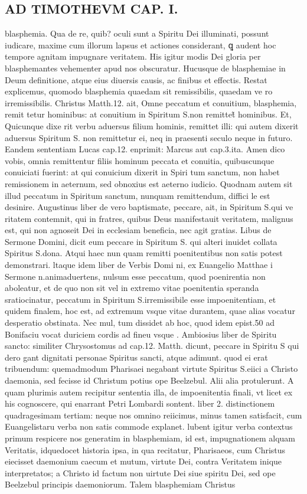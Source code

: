 \documentclass{article}
\begin{document}
\begin{pages}
\section*{AD TIMOTHEVM CAP. I. }
\marginpar{[ p.38 ]}\pstart blasphemia. Qua de re, quib? oculi sunt a Spiritu Dei illuminati, possunt iudicare, maxime cum illorum lapsus et actiones considerant, ꝗ audent hoc tempore agnitam impugnare veritatem. His igitur modis Dei gloria per blasphemantes vehementer apud nos obscuratur. Hucusque  de blasphemiae in Deum definitione, atque  eius diuersis causis, ac finibus et effectis. Restat explicemus, quomodo blasphemia quaedam sit remissibilis, quaedam ve ro irremissibilis. Christus Matth.12. ait, Omne peccatum et conuitium, blasphemia, remit tetur hominibus: at conuitium in Spiritum S.non remittet̃ hominibus. Et, Quicunque  dixe rit verbu aduersus filium hominis, remittet illi: qui autem dixerit aduersus Spiritum S. non remittetur ei, neq in praesenti seculo neque  in futuro. Eandem sententiam Lucas cap.12. enprimit: Marcus aut cap.3.ita. Amen dico vobis, omnia remittentur filiis hominum peccata et conuitia, quibuscunque  conuiciati fuerint: at qui conuicium dixerit in Spiri tum sanctum, non habet remissionem in aeternum, sed obnoxius est aeterno iudicio. Quodnam autem sit illud peccatum in Spiritum sanctum, nunquam remittendum, diffici le est desinire. Augustinus liber  de vero baptismate, peccare, ait, in Spiritum S.qui ve ritatem contemnit, qui in fratres, quibus Deus manifestauit veritatem, malignus est, qui non agnoseit Dei in ecclesiam beneficia, nec agit gratias. Libus de Sermone Domini, dicit eum peccare in Spiritum S. qui alteri inuidet collata Spiritus S.dona. Atqui haec nun quam remitti poenitentibus non satis potest demonstrari. ltaque  idem liber de Verbis Domi ni, ex Euangelio Matthae i Sermone n.animaduertens, nulsum esse peccatum, quod poenirentia non aboleatur, et de quo non sit vel in extremo vitae poenitentia speranda sratiocinatur, peccatum in Spiritum S.irremissibile esse impoenitentiam, et quidem finalem, hoc est, ad extremum vsque  vitae durantem, quae alias vocatur desperatio obstinata. Nec mul, tum dissidet ab hoc, quod idem epist.50 ad Bonifaciu vocat duriciem cordis ad fineu vsque . Ambiosius liber de Spiritu sancto: similiter Chrysostomus ad cap.12. Matth. dicunt, peccare in Spiritu S qui dero gant dignitati personae Spiritus sancti, atque  adimunt. quod ei erat tribuendum: quemadmodum Pharisaei negabant virtute Spiritus S.eiici a Christo daemonia, sed fecisse id Christum potius ope Beelzebul. Alii alia protulerunt. A quam plurimis autem recipitur sententia illa, de impoenitentia finali, vt licet ex his cognoscere, qui enarrant Petri Lombardi sontent. liber 2. distinctionem quadragesimam tertiam: neque  nos omnino reiicimus, minus tamen satisfacit, cum Euangelistaru verba non satis commode explanet. lubent igitur verba contextus primum respicere nos generatim in blasphemiam, id est, impugnationem alquam Veritatis, idquedocet historia ipsa, in qua recitatur, Pharisaeos, cum Christus eiecisset daemonium caecum et mutum, virtute Dei, contra Veritatem inique interpretatos; a Christo id factum non uirtute Dei siue spiritu Dei, sed ope Beelzebul principis daemoniorum. Talem blasphemiam Christus 
\end{pages}
\end{document}
